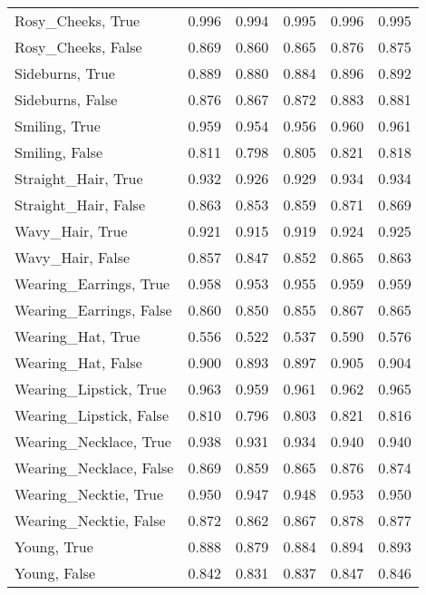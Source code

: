 \begin{tabular}{lrrrrr}
         Rosy\_Cheeks, True &   0.996 &        0.994 &         0.995 &     0.996 &     0.995 \\
        Rosy\_Cheeks, False &   0.869 &        0.860 &         0.865 &     0.876 &     0.875 \\
           Sideburns, True &   0.889 &        0.880 &         0.884 &     0.896 &     0.892 \\
          Sideburns, False &   0.876 &        0.867 &         0.872 &     0.883 &     0.881 \\
             Smiling, True &   0.959 &        0.954 &         0.956 &     0.960 &     0.961 \\
            Smiling, False &   0.811 &        0.798 &         0.805 &     0.821 &     0.818 \\
       Straight\_Hair, True &   0.932 &        0.926 &         0.929 &     0.934 &     0.934 \\
      Straight\_Hair, False &   0.863 &        0.853 &         0.859 &     0.871 &     0.869 \\
           Wavy\_Hair, True &   0.921 &        0.915 &         0.919 &     0.924 &     0.925 \\
          Wavy\_Hair, False &   0.857 &        0.847 &         0.852 &     0.865 &     0.863 \\
    Wearing\_Earrings, True &   0.958 &        0.953 &         0.955 &     0.959 &     0.959 \\
   Wearing\_Earrings, False &   0.860 &        0.850 &         0.855 &     0.867 &     0.865 \\
         Wearing\_Hat, True &   0.556 &        0.522 &         0.537 &     0.590 &     0.576 \\
        Wearing\_Hat, False &   0.900 &        0.893 &         0.897 &     0.905 &     0.904 \\
    Wearing\_Lipstick, True &   0.963 &        0.959 &         0.961 &     0.962 &     0.965 \\
   Wearing\_Lipstick, False &   0.810 &        0.796 &         0.803 &     0.821 &     0.816 \\
    Wearing\_Necklace, True &   0.938 &        0.931 &         0.934 &     0.940 &     0.940 \\
   Wearing\_Necklace, False &   0.869 &        0.859 &         0.865 &     0.876 &     0.874 \\
     Wearing\_Necktie, True &   0.950 &        0.947 &         0.948 &     0.953 &     0.950 \\
    Wearing\_Necktie, False &   0.872 &        0.862 &         0.867 &     0.878 &     0.877 \\
               Young, True &   0.888 &        0.879 &         0.884 &     0.894 &     0.893 \\
              Young, False &   0.842 &        0.831 &         0.837 &     0.847 &     0.846 \\
\bottomrule
\end{tabular}
